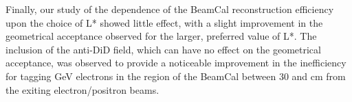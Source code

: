 Finally, our study of the dependence of the BeamCal reconstruction efficiency upon the choice of L* showed little effect, with a slight improvement in the geometrical acceptance observed for the larger, preferred value of L*. The inclusion of the anti-DiD field, which can have no effect on the geometrical acceptance, was observed to provide a noticeable improvement in the inefficiency for tagging \unit[50]{GeV} electrons in the region of the BeamCal between 30 and \unit[40]{cm} from the exiting electron/positron beams.


